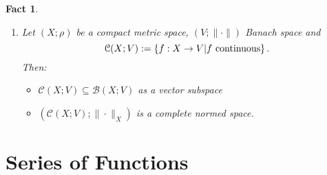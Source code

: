 \documentclass[12pt]{amsbook}
\newtheorem{fact}[theorem]{Fact}
\theoremstyle{definition}
\newcommand{\cB}{{\mathcal B}}
\newcommand{\cC}{{\mathcal C}}
\newcommand{\ra}{\rightarrow} %
\begin{document}
\begin{fact}
\begin{enumerate}
\begin{proof}
hence $f_n \xrightarrow[n]{\|\cdot\|_X} f$.
\end{proof}

\item Let $(X; \rho)$ be a compact metric space, $(V; \|\cdot\|)$ Banach space and
\begin{equation*} \cC(X; V) := \left\{f: X \ra V | f \textup{ continuous} \right\}. \end{equation*}
Then:
\begin{itemize}
\item[$\bullet$] $\cC(X; V) \subseteq \cB(X; V)$ as a vector subspace
\item[$\bullet$] $(\cC(X; V); \|\cdot\|_X)$ is a complete normed space.
\end{itemize}
\end{enumerate}
\end{fact}

\section{Series of Functions}
\end{document}
